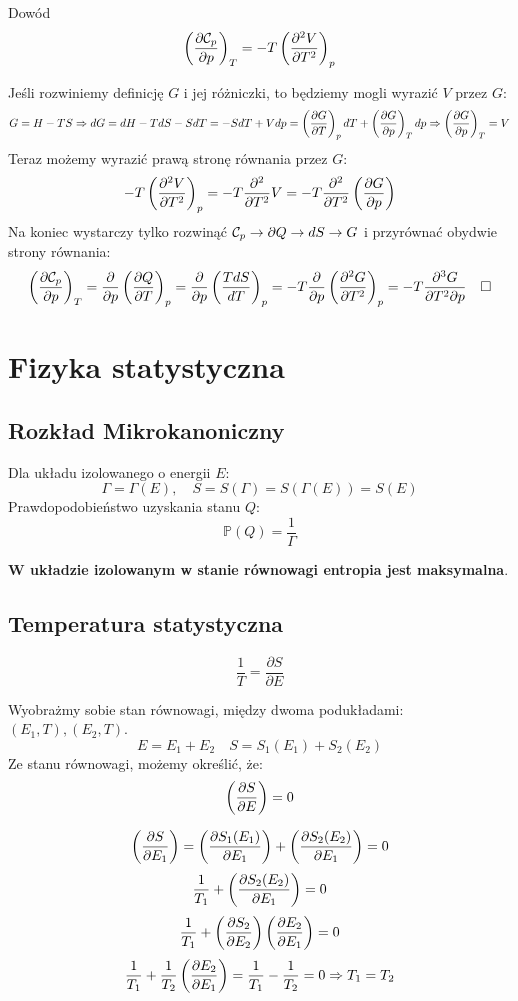 \documentclass{../notatki}
\begin{document}
\begin{examplebox}
  Dowód
  $$
  \left(\frac{\partial \mathcal{C}_p}{\partial p}\right)_T = -T\left(\frac{\partial^2 V}{\partial T^2}\right)_p
  $$

  \vspace{1em}
  Jeśli rozwiniemy definicję $G$ i jej różniczki, to będziemy mogli
  wyrazić $V$ przez $G$:
  $$
  G = H - TS \Rightarrow dG = dH - TdS - SdT = -SdT + Vdp =
  \left(\frac{\partial G}{\partial T}\right)_p dT + \left(\frac{\partial G}{\partial p}\right)_T dp \Rightarrow \left(\frac{\partial G}{\partial p}\right)_T = V
  $$
  Teraz możemy wyrazić prawą stronę równania przez $G$:
  $$
  -T\left(\frac{\partial^2 V}{\partial T^2}\right)_p = -T
  \frac{\partial^2}{\partial T^2} V = -T
  \frac{\partial^2}{\partial T^2} \left(\frac{\partial G}{\partial p}\right)
  $$
  Na koniec wystarczy tylko rozwinąć $\mathcal{C}_p \to \partial Q \to dS \to
  G$ i przyrównać obydwie strony równania:
  $$
  \left(\frac{\partial \mathcal{C}_p}{\partial p}\right)_T = \frac{\partial}{\partial p} \left(\frac{\partial Q}{\partial T}\right)_p =
  \frac{\partial}{\partial p} \left(\frac{TdS}{dT}\right)_p = -T
  \frac{\partial}{\partial p}
  \left(\frac{\partial^2 G}{\partial
  T^2}\right)_p = -T \frac{\partial^3 G}{\partial T^2 \partial p} \quad \square
  $$
\end{examplebox}

\section{Fizyka statystyczna}

\subsection{Rozkład Mikrokanoniczny}

Dla układu izolowanego o energii $E$:
$$
\Gamma = \Gamma(E), \quad S = S(\Gamma) = S(\Gamma(E)) = S(E)
$$
Prawdopodobieństwo uzyskania stanu $Q$:
$$
\mathbb{P}(Q) = \frac{1}{\Gamma}
$$

\textbf{W układzie izolowanym w stanie równowagi entropia jest maksymalna}.

\subsection{Temperatura statystyczna}

$$
\frac{1}{T} = \frac{\partial S}{\partial E}
$$

\begin{examplebox}
  Wyobrażmy sobie stan równowagi, między dwoma podukładami: $(E_1,
  T), (E_2, T)$.
  $$
  E = E_1 + E_2 \quad S = S_1(E_1) + S_2(E_2)
  $$
  Ze stanu równowagi, możemy określić, że:
  $$
  \left(\frac{\partial S}{\partial E}\right) = 0
  $$

  \vspace{1em}
  $$
  \left(\frac{\partial S}{\partial E_1}\right) = \left(\frac{\partial S_1(E_1)}{\partial E_1}\right) + \left(\frac{\partial S_2(E_2)}{\partial E_1}\right) = 0
  $$
  $$
  \frac{1}{T_1} + \left(\frac{\partial S_2(E_2)}{\partial E_1}\right) = 0
  $$
  $$
  \frac{1}{T_1} + \left(\frac{\partial S_2}{\partial E_2}\right)\left(\frac{\partial E_2}{\partial E_1}\right) = 0
  $$
  $$
  \frac{1}{T_1} + \frac{1}{T_2}\left(\frac{\partial E_2}{\partial E_1}\right) = \frac{1}{T_1} -
  \frac{1}{T_2} = 0 \Rightarrow T_1 = T_2
  $$
\end{examplebox}
\end{document}
